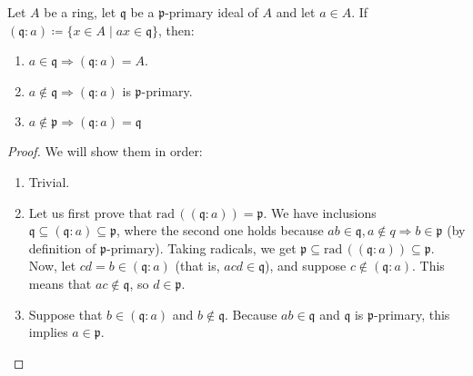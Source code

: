 \begin{lemma}
    Let $A$ be a ring, let $\mathfrak{q}$ be a $\mathfrak{p}$-primary ideal of $A$
    and let $a \in A$.
    If \linebreak ${(\mathfrak{q} : a) \coloneqq \{x \in A \mid ax \in \mathfrak{q}\}}$,
    then:

    \begin{enumerate}
        \item $a \in \mathfrak{q} \Rightarrow (\mathfrak{q} : a) = A$.
        \item $a \notin \mathfrak{q} \Rightarrow (\mathfrak{q} : a)$ is $\mathfrak{p}$-primary.
        \item $a \notin \mathfrak{p} \Rightarrow (\mathfrak{q} : a) = \mathfrak{q}$
    \end{enumerate}

    \begin{proof}
        We will show them in order:
        \begin{enumerate}

            \item
            Trivial.

            \item
            Let us first prove that $\text{rad}\,((\mathfrak{q} : a)) = \mathfrak{p}$.
            We have inclusions
            $\mathfrak{q} \subseteq (\mathfrak{q} : a) \subseteq \mathfrak{p}$,
            where the second one holds because
            $ab \in \mathfrak{q}, a \notin q \Rightarrow b \in \mathfrak{p}$
            (by definition of $\mathfrak{p}$-primary).
            Taking radicals, we get
            $\mathfrak{p} \subseteq \text{rad}\,((\mathfrak{q} : a)) \subseteq \mathfrak{p}$.
            Now, let $cd = b \in (\mathfrak{q} : a)$ (that is, $acd \in \mathfrak{q}$),
            and suppose $c \notin (\mathfrak{q} : a)$.
            This means that $ac \notin \mathfrak{q}$, so $d \in \mathfrak{p}$.

            \item
            Suppose that $b \in (\mathfrak{q} : a)$ and $b \notin \mathfrak{q}$.
            Because $ab \in \mathfrak{q}$ and $\mathfrak{q}$ is $\mathfrak{p}$-primary,
            this implies $a \in \mathfrak{p}$.

        \end{enumerate}
    \end{proof}
\end{lemma}

